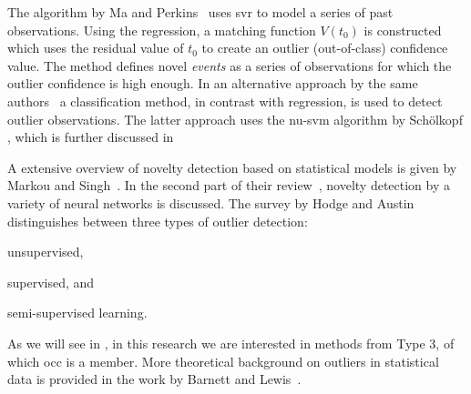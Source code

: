 The algorithm by Ma and Perkins~\cite{markou2003novelty} uses \gls{svr} to model a series of past observations.
Using the regression, a matching function $V(t_0)$ is constructed which uses the residual value of $t_0$ to create an outlier (out-of-class) confidence value.
The method defines novel \emph{events} as a series of observations for which the outlier confidence is high enough.
In an alternative approach by the same authors~\cite{ma2003time} a classification method, in contrast with regression, is used to detect outlier observations.
The latter approach uses the \gls{nu-svm} algorithm by Sch\"olkopf \etal \cite{scholkopf1999support}, which is further discussed in 

A extensive overview of novelty detection based on statistical models is given by Markou and Singh~\cite{markou2003novelty}.
In the second part of their review~\cite{markou2003novelty-neural}, novelty detection by a variety of neural networks is discussed.
The survey by Hodge and Austin~\cite{hodge2004survey} distinguishes between three types of outlier detection: \begin{inparaenum}[1)]
    \item unsupervised,
    \item supervised, and
    \item semi-supervised learning.
  \end{inparaenum}
As we will see in , in this research we are interested in methods from Type 3, of which \gls{occ} is a member.
More theoretical background on outliers in statistical data is provided in the work by Barnett and Lewis~\cite{barnett1994outliers}.
